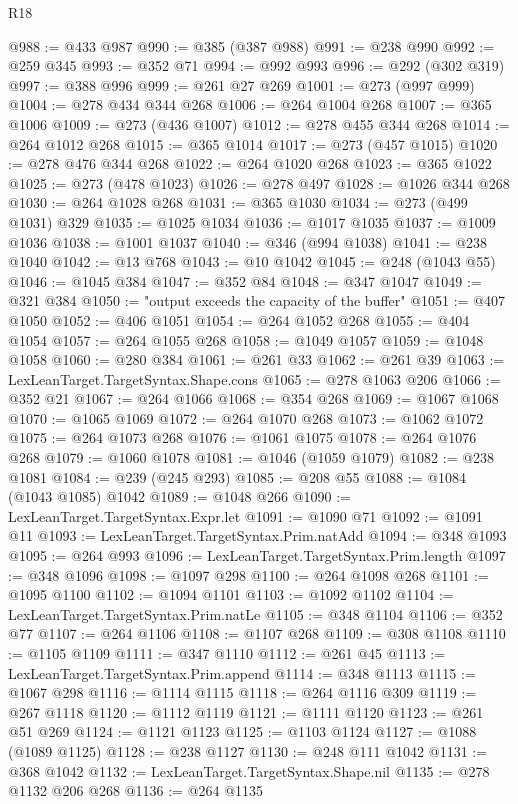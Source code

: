 \begin{lexlean}{R18}
\begin{coremodule}
{{{{{{{{{{{{{{{{{{{@988 := @433 @987
@990 := @385 (@387 @988)
@991 := @238 @990
@992 := @259 @345
@993 := @352 @71
@994 := @992 @993
@996 := @292 (@302 @319)
@997 := @388 @996
@999 := @261 @27 @269
@1001 := @273 (@997 @999)
@1004 := @278 @434 @344 @268
@1006 := @264 @1004 @268
@1007 := @365 @1006
@1009 := @273 (@436 @1007)
@1012 := @278 @455 @344 @268
@1014 := @264 @1012 @268
@1015 := @365 @1014
@1017 := @273 (@457 @1015)
@1020 := @278 @476 @344 @268
@1022 := @264 @1020 @268
@1023 := @365 @1022
@1025 := @273 (@478 @1023)
@1026 := @278 @497
@1028 := @1026 @344 @268
@1030 := @264 @1028 @268
@1031 := @365 @1030
@1034 := @273 (@499 @1031) @329
@1035 := @1025 @1034
@1036 := @1017 @1035
@1037 := @1009 @1036
@1038 := @1001 @1037
@1040 := @346 (@994 @1038)
@1041 := @238 @1040
@1042 := @13 @768
@1043 := @10 @1042
@1045 := @248 (@1043 @55)
@1046 := @1045 @384
@1047 := @352 @84
@1048 := @347 @1047
@1049 := @321 @384
@1050 := "output exceeds the capacity of the buffer"
@1051 := @407 @1050
@1052 := @406 @1051
@1054 := @264 @1052 @268
@1055 := @404 @1054
@1057 := @264 @1055 @268
@1058 := @1049 @1057
@1059 := @1048 @1058
@1060 := @280 @384
@1061 := @261 @33
@1062 := @261 @39
@1063 := LexLeanTarget.TargetSyntax.Shape.cons
@1065 := @278 @1063 @206
@1066 := @352 @21
@1067 := @264 @1066
@1068 := @354 @268
@1069 := @1067 @1068
@1070 := @1065 @1069
@1072 := @264 @1070 @268
@1073 := @1062 @1072
@1075 := @264 @1073 @268
@1076 := @1061 @1075
@1078 := @264 @1076 @268
@1079 := @1060 @1078
@1081 := @1046 (@1059 @1079)
@1082 := @238 @1081
@1084 := @239 (@245 @293)
@1085 := @208 @55
@1088 := @1084 (@1043 @1085) @1042
@1089 := @1048 @266
@1090 := LexLeanTarget.TargetSyntax.Expr.let
@1091 := @1090 @71
@1092 := @1091 @11
@1093 := LexLeanTarget.TargetSyntax.Prim.natAdd
@1094 := @348 @1093
@1095 := @264 @993
@1096 := LexLeanTarget.TargetSyntax.Prim.length
@1097 := @348 @1096
@1098 := @1097 @298
@1100 := @264 @1098 @268
@1101 := @1095 @1100
@1102 := @1094 @1101
@1103 := @1092 @1102
@1104 := LexLeanTarget.TargetSyntax.Prim.natLe
@1105 := @348 @1104
@1106 := @352 @77
@1107 := @264 @1106
@1108 := @1107 @268
@1109 := @308 @1108
@1110 := @1105 @1109
@1111 := @347 @1110
@1112 := @261 @45
@1113 := LexLeanTarget.TargetSyntax.Prim.append
@1114 := @348 @1113
@1115 := @1067 @298
@1116 := @1114 @1115
@1118 := @264 @1116 @309
@1119 := @267 @1118
@1120 := @1112 @1119
@1121 := @1111 @1120
@1123 := @261 @51 @269
@1124 := @1121 @1123
@1125 := @1103 @1124
@1127 := @1088 (@1089 @1125)
@1128 := @238 @1127
@1130 := @248 @111 @1042
@1131 := @368 @1042
@1132 := LexLeanTarget.TargetSyntax.Shape.nil
@1135 := @278 @1132 @206 @268
@1136 := @264 @1135
}}}}}}}}}}}}}}}}}}}
\end{coremodule}
\end{lexlean}
